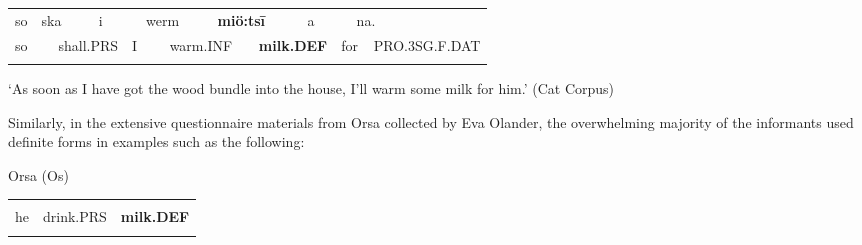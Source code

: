 \begin{tabular}{llllllllllllll}
\lsptoprule
so & \multicolumn{2}{l}{ska

} & \multicolumn{2}{l}{i

} & \multicolumn{2}{l}{werm

} & \multicolumn{2}{l}{{\bfseries miö:ts\={i}}

} & \multicolumn{2}{l}{a

} & \multicolumn{2}{l}{na.

} & \\
\multicolumn{2}{l}{so

} & \multicolumn{2}{l}{shall.PRS

} & \multicolumn{2}{l}{I

} & \multicolumn{2}{l}{warm.INF

} & \multicolumn{2}{l}{{\bfseries milk.DEF}

} & \multicolumn{2}{l}{for

} & \multicolumn{2}{l}{PRO.3SG.F.DAT

}\\
\lspbottomrule
\end{tabular}

\begin{styleTranslation}
 ‘As soon as I have got the wood bundle into the house, I’ll warm some milk for him.’ (Cat Corpus)

\end{styleTranslation}

\begin{styleBodyTextFirst}
Similarly, in the extensive questionnaire materials from Orsa collected by Eva Olander, the overwhelming majority of the informants used definite forms in examples such as the following:

\end{styleBodyTextFirst}


\begin{listWWNumileveli}
\item 

\begin{styleExample}
Orsa (Os)

\end{styleExample}

\end{listWWNumileveli}

\begin{tabular}{lll}
\lsptoprule
\multicolumn{3}{l}{An

}\\
he & drink.PRS & {\bfseries milk.DEF}\\
\lspbottomrule
\end{tabular}


